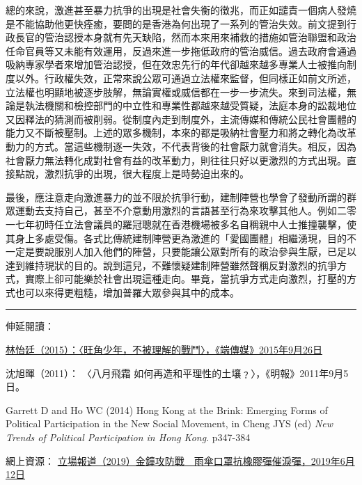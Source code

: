 總的來說，激進甚至暴力抗爭的出現是社會失衡的徵兆，而正如譴責一個病人發燒是不能協助他更快痊癒，要問的是香港為何出現了一系列的管治失效。前文提到行政長官的管治認授本身就有先天缺陷，然而本來用來補救的措施如管治聯盟和政治任命官員等又未能有效運用，反過來進一步拖低政府的管治威信。過去政府會通過吸納專家學者來增加管治認授，但在效忠先行的年代卻越來越多專業人士被推向制度以外。行政權失效，正常來說公眾可通過立法權來監督，但同樣正如前文所述，立法權也明顯地被逐步肢解，無論實權或威信都在一步一步流失。來到司法權，無論是執法機關和檢控部門的中立性和專業性都越來越受質疑，法庭本身的訟裁地位又因釋法的猜測而被削弱。從制度內走到制度外，主流傳媒和傳統公民社會團體的能力又不斷被壓制。上述的眾多機制，本來的都是吸納社會壓力和將之轉化為改革動力的方式。當這些機制逐一失效，不代表背後的社會厭力就會消失。相反，因為社會厭力無法轉化成對社會有益的改革動力，則往往只好以更激烈的方式出現。直接點說，激烈抗爭的出現，很大程度上是時勢迫出來的。

最後，應注意走向激進暴力的並不限於抗爭行動，建制陣營也學會了發動所謂的群眾運動去支持自己，甚至不介意動用激烈的言語甚至行為來攻擊其他人。例如二零一七年初時任立法會議員的羅冠聰就在香港機場被多名自稱親中人士推撞襲擊，使其身上多處受傷。各式比傳統建制陣營更為激進的「愛國團體」相繼湧現，目的不一定是要說服別人加入他們的陣營，只要能讓公眾對所有的政治參與生厭，已足以達到維持現狀的目的。說到這兒，不難懷疑建制陣營雖然聲稱反對激烈的抗爭方式，實際上卻可能樂於社會出現這種走向。畢竟，當抗爭方式走向激烈，打壓的方式也可以來得更粗糙，增加普羅大眾參與其中的成本。

\rule[-10pt]{15cm}{0.05em}

伸延閱讀：

\href{https://theinitium.com/article/20150921-hongkong-occupycentraloneyear02/}{林怡廷（2015）：〈旺角少年，不被理解的戰鬥〉，《端傳媒》2015年9月26日}

沈旭暉（2011）： 〈八月飛霜 如何再造和平理性的土壤﹖〉，《明報》2011年9月5日。

Garrett D and Ho WC (2014) Hong Kong at the Brink: Emerging Forms of Political Participation in the New Social Movement, in Cheng JYS (ed) \textit{New Trends of Political Participation in Hong Kong}. p347-384

網上資源：
\href{http://thestand.news/politics/6-12-佔領-圖輯二-金鐘攻防戰-雨傘口罩抗橡膠彈催淚彈/}{立場報道（2019）金鐘攻防戰　雨傘口罩抗橡膠彈催淚彈，2019年6月12日}